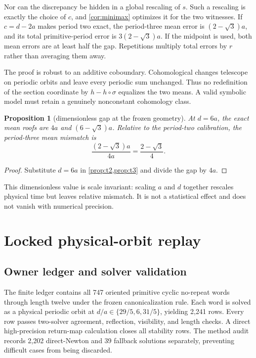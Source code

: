 \documentclass[11pt,a4paper]{article}
\newtheorem{proposition}[theorem]{Proposition}
\theoremstyle{definition}
\theoremstyle{remark}
\begin{document}
Nor can the discrepancy be hidden in a global rescaling of \(s\). Such a rescaling is exactly the choice of \(c\), and \cref{cor:minimax} optimizes it for the two witnesses. If \(c=d-2a\) makes period two exact, the period-three mean error is \((2-\sqrt3)a\), and its total primitive-period error is \(3(2-\sqrt3)a\). If the midpoint is used, both mean errors are at least half the gap. Repetitions multiply total errors by \(r\) rather than averaging them away.

The proof is robust to an additive coboundary. Cohomological changes telescope on periodic orbits and leave every periodic sum unchanged. Thus no redefinition of the section coordinate by \(h-h\circ\sigma\) equalizes the two means. A valid symbolic model must retain a genuinely nonconstant cohomology class.

\begin{proposition}[dimensionless gap at the frozen geometry]
At \(d=6a\), the exact mean roofs are \(4a\) and \((6-\sqrt3)a\). Relative to the period-two calibration, the period-three mean mismatch is
\[
 \frac{(2-\sqrt3)a}{4a}=\frac{2-\sqrt3}{4}.
\]
\end{proposition}
\begin{proof}
Substitute \(d=6a\) in \cref{prop:t2,prop:t3} and divide the gap by \(4a\).
\end{proof}

This dimensionless value is scale invariant: scaling \(a\) and \(d\) together rescales physical time but leaves relative mismatch. It is not a statistical effect and does not vanish with numerical precision.

\section{Locked physical-orbit replay}

\subsection{Owner ledger and solver validation}

The finite ledger contains all 747 oriented primitive cyclic no-repeat words through length twelve under the frozen canonicalization rule. Each word is solved as a physical periodic orbit at \(d/a\in\{29/5,6,31/5\}\), yielding 2,241 rows. Every row passes two-solver agreement, reflection, visibility, and length checks. A direct high-precision return-map calculation closes all stability rows. The method audit records 2,202 direct-Newton and 39 fallback solutions separately, preventing difficult cases from being discarded.
\end{document}
